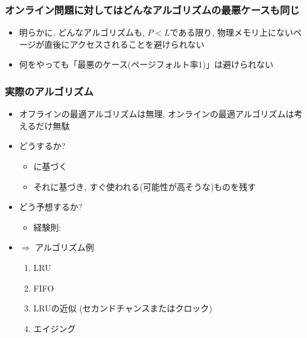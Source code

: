 \documentclass[12pt,dvipdfmx]{beamer}
\begin{document}
\begin{frame}
  \frametitle{オンライン問題に対してはどんなアルゴリズムの最悪ケースも同じ}
  \begin{itemize}
  \item 明らかに, どんなアルゴリズムも, $P < L$である限り,
    物理メモリ上にないページが直後にアクセスされることを避けられない
  \item 何をやっても「最悪のケース(ページフォルト率1)」は避けられない
  \end{itemize}
\end{frame}

\begin{frame}
  \frametitle{実際のアルゴリズム}
  \begin{itemize}
  \item オフラインの最適アルゴリズムは無理, オンラインの最適アルゴリズムは考えるだけ無駄
  \item どうするか?
    \begin{itemize}
    \item {}に基づく
    \item それに基づき, すぐ使われる(可能性が高そうな)ものを残す
    \end{itemize}
  \item どう予想するか?
    \begin{itemize}
    \item 経験則: 
    \end{itemize}
  \item $\Rightarrow$ アルゴリズム例
    \begin{enumerate}
    \item LRU
    \item FIFO
    \item LRUの近似 (セカンドチャンスまたはクロック)
    \item エイジング
    \end{enumerate}
  \end{itemize}
\end{frame}
\end{document}
